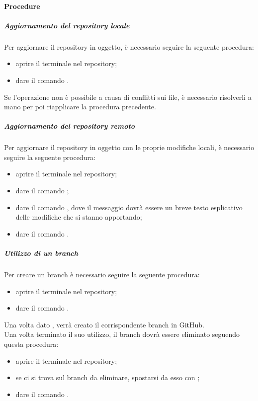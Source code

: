 \paragraph{Procedure}
\subparagraph{Aggiornamento del repository locale} 
Per aggiornare il repository in oggetto, è necessario seguire la seguente procedura:
\begin{itemize}
	\item aprire il terminale nel repository;
	\item dare il comando .
\end{itemize}
Se l'operazione non è possibile a causa di conflitti sui file, è necessario risolverli a mano per poi riapplicare la procedura precedente.
\subparagraph{Aggiornamento del repository remoto}
Per aggiornare il repository in oggetto con le proprie modifiche locali, è necessario seguire la seguente procedura:
\begin{itemize}
	\item aprire il terminale nel repository;
	\item dare il comando  ;
	\item dare il comando , dove il messaggio dovrà essere un breve testo esplicativo delle modifiche che si stanno apportando;
	\item dare il comando .
\end{itemize}
\subparagraph{Utilizzo di un branch}
Per creare un branch è necessario seguire la seguente procedura:
\begin{itemize}
	\item aprire il terminale nel repository;
	\item dare il comando .
\end{itemize}
Una volta dato , verrà creato il corrispondente branch in GitHub. \\
Una volta terminato il suo utilizzo, il branch dovrà essere eliminato seguendo questa procedura:
\begin{itemize}
	\item aprire il terminale nel repository;
	\item se ci si trova sul branch da eliminare, spostarsi da esso con ;
	\item dare il comando .
\end{itemize}
